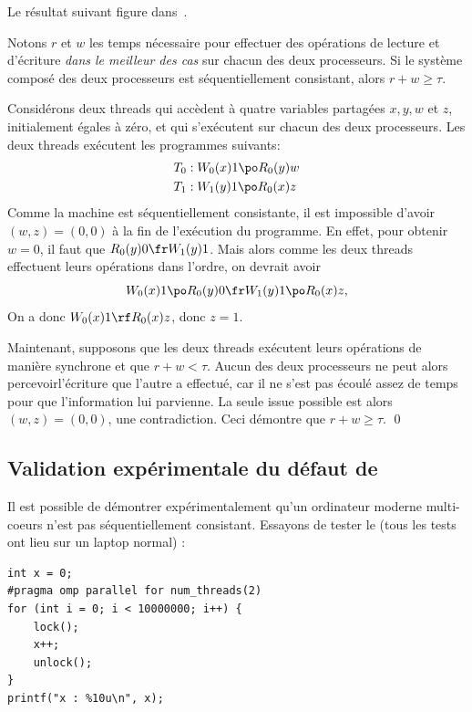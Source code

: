 Le résultat suivant figure dans~\cite{Lipton1988PramAS}. \medskip

\begin{theorem}\label{thm:sc_slow}
  Notons $r$ et $w$ les temps nécessaire pour effectuer des opérations de
  lecture et d'écriture \emph{dans le meilleur des cas} sur chacun des deux
  processeurs. Si le système composé des deux processeurs est séquentiellement
  consistant, alors $r + w \geq \tau$.
\end{theorem}

\begin{myproof}
  Considérons deux threads qui accèdent à quatre variables partagées $x, y, w$
  et $z$, initialement égales à zéro, et qui s'exécutent sur chacun des deux
  processeurs. Les deux threads exécutent les programmes suivants:
  \begin{align*}
    T_0 &: W_0(x)1 \po R_0(y) w \\
    T_1 &: W_1(y)1 \po R_0(x) z
  \end{align*}
  Comme la machine est séquentiellement consistante, il est impossible d'avoir
  $(w,z) = (0, 0)$ à la fin de l'exécution du programme. En effet, pour obtenir
  $w=0$, il faut que $R_0(y)0 \fr W_1(y)1$. Mais alors comme les deux threads
  effectuent leurs opérations dans l'ordre, on devrait avoir
  \[
    W_0(x)1 \po R_0(y) 0 \fr W_1(y)1 \po R_0(x) z,
  \]
  On a donc $W_0(x)1 \rf R_0(x) z$, donc $z=1$.

  Maintenant, supposons que les deux threads exécutent leurs opérations de
  manière synchrone et que $r+w < \tau$. Aucun des deux processeurs ne peut
  alors \og percevoir\fg l'écriture que l'autre a effectué, car il ne s'est pas
  écoulé assez de temps pour que l'information lui parvienne. La seule issue
  possible est alors $(w,z) = (0, 0)$, une contradiction. Ceci démontre que
  $r+w \geq \tau$. \qed
\end{myproof}

\subsection{Validation expérimentale du défaut de }

Il est possible de démontrer expérimentalement qu'un ordinateur moderne
multi-coeurs n'est pas séquentiellement consistant. Essayons de tester le
 (tous les tests ont lieu sur un laptop normal) :

\begin{myfilet}
\begin{verbatim}
int x = 0;
#pragma omp parallel for num_threads(2)
for (int i = 0; i < 10000000; i++) {
	lock();
	x++;
	unlock();
}
printf("x : %10u\n", x);
\end{verbatim}
\end{myfilet}

